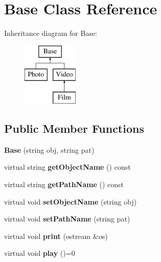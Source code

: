 \hypertarget{class_base}{}\section{Base Class Reference}
\label{class_base}
Inheritance diagram for Base\+:\begin{figure}[H]
\begin{center}
\leavevmode
\includegraphics[height=3.000000cm]{class_base}
\end{center}
\end{figure}
\subsection*{Public Member Functions}
\begin{DoxyCompactItemize}
\item 
{\bfseries Base} (string obj, string pat)\hypertarget{class_base_a640c1141376d73d370b9ec15b254a515}{}\label{class_base_a640c1141376d73d370b9ec15b254a515}

\item 
virtual string {\bfseries get\+Object\+Name} () const \hypertarget{class_base_a518aecec79e084c1f49837c3cf1d0bad}{}\label{class_base_a518aecec79e084c1f49837c3cf1d0bad}

\item 
virtual string {\bfseries get\+Path\+Name} () const \hypertarget{class_base_a60d5c870af8cc2319ecb87abe520a23c}{}\label{class_base_a60d5c870af8cc2319ecb87abe520a23c}

\item 
virtual void {\bfseries set\+Object\+Name} (string obj)\hypertarget{class_base_a9f12058257f1d74f7c80854a239416b3}{}\label{class_base_a9f12058257f1d74f7c80854a239416b3}

\item 
virtual void {\bfseries set\+Path\+Name} (string pat)\hypertarget{class_base_af721d8940f7eb3cb0c72ba1155ce62c0}{}\label{class_base_af721d8940f7eb3cb0c72ba1155ce62c0}

\item 
virtual void {\bfseries print} (ostream \&os)\hypertarget{class_base_a8e0c44b66d66561fb1e10f5cc51459f2}{}\label{class_base_a8e0c44b66d66561fb1e10f5cc51459f2}

\item 
virtual void {\bfseries play} ()=0\hypertarget{class_base_a0a530a1710ef999953402c59e5df2861}{}\label{class_base_a0a530a1710ef999953402c59e5df2861}

\end{DoxyCompactItemize}
